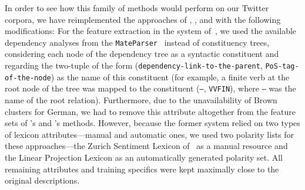 In order to see how this family of methods would perform on our
Twitter corpora, we have reimplemented the approaches of
\citet{Gamon:04}, \citet{Mohammad:13}, and \citet{Guenther:14} with
the following modifications: For the feature extraction in the system
of~\citet{Gamon:04}, we used the available dependency analyses from
the \texttt{MateParser}~\cite{Bohnet:09} instead of constituency
trees, considering each node of the dependency tree as a syntactic
constituent and regarding the two-tuple of the form
(\texttt{dependency-link-to-the-parent}, \texttt{PoS-tag-of-the-node})
as the name of this constituent (for example, a finite verb at the
root node of the tree was mapped to the constituent (\texttt{--},
\texttt{VVFIN}), where \texttt{--} was the name of the root relation).
Furthermore, due to the unavailability of Brown clusters for German,
we had to remove this attribute altogether from the feature sets of
\citeauthor{Mohammad:13}'s and \citeauthor{Guenther:14}'s methods.
However, because the former system relied on two types of lexicon
attributes---manual and automatic ones, we used two polarity lists for
these approaches---the Zurich Sentiment Lexicon
of~\citet{Clematide:10} as a manual resource and the Linear Projection
Lexicon as an automatically generated polarity set.  All remaining
attributes and training specifics were kept maximally close to the
original descriptions.

